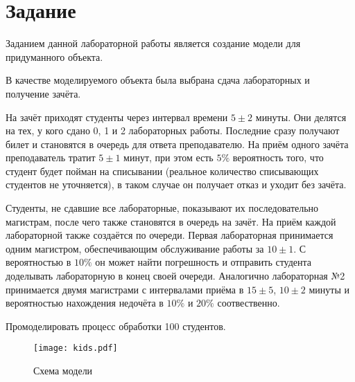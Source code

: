\section{Задание}
Заданием данной лабораторной работы является создание модели для придуманного объекта.

В качестве моделируемого объекта была выбрана сдача лабораторных и получение зачёта. 

На зачёт приходят студенты через интервал времени $5\pm2$ минуты. Они делятся на тех, у кого сдано 0, 1 и 2 лабораторных работы. Последние сразу получают билет и становятся в очередь для ответа преподавателю. На приём одного зачёта преподаватель тратит $5\pm1$ минут, при этом есть $5\%$ вероятность того, что студент будет пойман на списывании (реальное количество списывающих студентов не уточняется), в таком случае он получает отказ и уходит без зачёта. 

Студенты, не сдавшие все лабораторные, показывают их последовательно магистрам, после чего также становятся в очередь на зачёт. На приём каждой лабораторной также создаётся по очереди. Первая лабораторная принимается одним магистром, обеспечивающим обслуживание работы за $10\pm1$. С вероятностью в $10\%$ он может найти погрешность и отправить студента доделывать лабораторную в конец своей очереди. Аналогично лабораторная №2 принимается двумя магистрами с интервалами приёма в $15\pm5$, $10\pm2$ минуты и вероятностью нахождения недочёта в $10\%$ и $20\%$ соотвественно.

Промоделировать процесс обработки 100 студентов.

\begin{figure}[h]
	\begin{center}
		{\texttt{[image: kids.pdf]}
			\caption{Схема модели}
			\label{pic:1}}
	\end{center}
\end{figure}